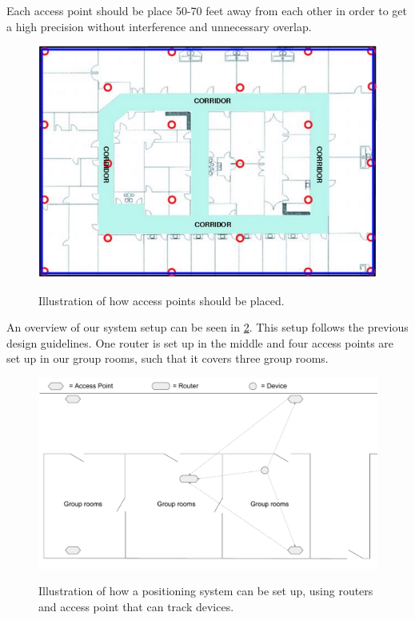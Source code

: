 Each access point should be place 50-70 feet away from each other in order to get a high precision without interference and unnecessary overlap\cite{access_point_range}.

\begin{figure}[H]
	\centering
	\includegraphics[scale=0.5]{graphics/access_placement.png}
	\label{fig:access_placement}
	\caption{Illustration of how access points should be placed.}
\end{figure}

An overview of our system setup can be seen in \cref{fig:OwnSetup}. This setup follows the previous design guidelines. One router is set up in the middle and four access points are set up in our group rooms, such that it covers three group rooms.

\begin{figure}[H]
	\centering
	\includegraphics[scale=0.5]{graphics/Router-AccessPoint_Setup.pdf}
	\label{fig:OwnSetup}
	\caption{Illustration of how a positioning system can be set up, using routers and access point that can track devices.}
\end{figure}

